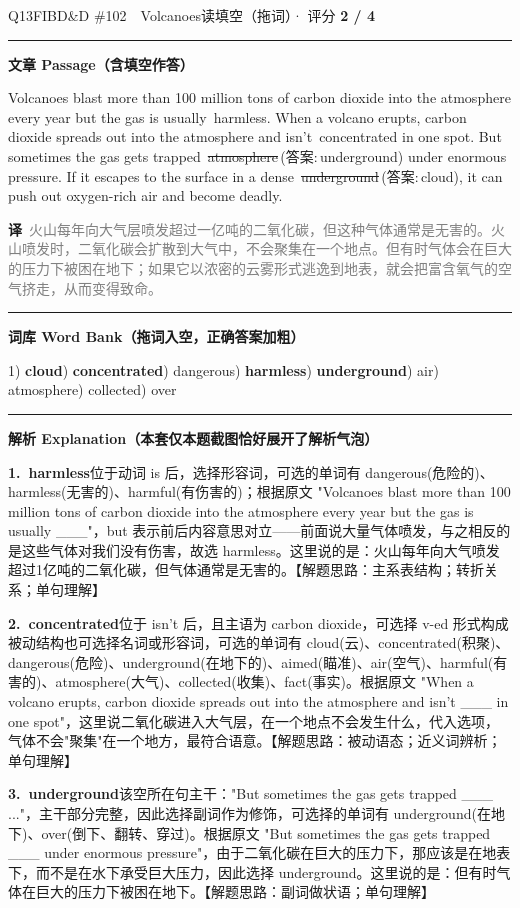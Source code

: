 \documentclass[11pt]{article}
\newcommand{\ptesub}[1]{%
  \par\needspace{2\baselineskip}\smallskip
  {\color{cAccent}\rule[-0.2ex]{3pt}{1.05em}}\hspace{6pt}%
  {\bfseries\color{cHead}#1}\par\nopagebreak\smallskip}
\newcommand{\zh}[1]{{\footnotesize\textcolor{cNote}{\textbf{译}}\ \textcolor{gray}{#1}}}
\newcommand{\rok}[1]{{\color{cFix}\ding{51}\,#1}}                 %
\newcommand{\rno}[2]{{\color{cWrong}\ding{55}\,\sout{#1}}\,{\footnotesize\color{cFix}(答案:\,#2)}}  %
\begin{document}
\begin{qblock}{Q13\quad FIBD\&D \#102\ \ Volcanoes}{读填空（拖词）· 评分 \textcolor{cAccent}{\bfseries 2 / 4}}
\ptesub{文章 Passage（含填空作答）}
\begin{promptbox}
Volcanoes blast more than 100 million tons of carbon dioxide into the atmosphere every year but the gas is usually \rok{harmless}. When a volcano erupts, carbon dioxide spreads out into the atmosphere and isn't \rok{concentrated} in one spot. But sometimes the gas gets trapped \rno{atmosphere}{underground} under enormous pressure. If it escapes to the surface in a dense \rno{underground}{cloud}, it can push out oxygen-rich air and become deadly.
\end{promptbox}
\zh{火山每年向大气层喷发超过一亿吨的二氧化碳，但这种气体通常是无害的。火山喷发时，二氧化碳会扩散到大气中，不会聚集在一个地点。但有时气体会在巨大的压力下被困在地下；如果它以浓密的云雾形式逃逸到地表，就会把富含氧气的空气挤走，从而变得致命。}
\ptesub{词库 Word Bank（拖词入空，正确答案加粗）}
{\small 1) \textbf{cloud}) \textbf{concentrated}) dangerous) \textbf{harmless}) \textbf{underground}) air) atmosphere) collected) over}
\ptesub{解析 Explanation（本套仅本题截图恰好展开了解析气泡）}
\begin{notebox}\footnotesize
\textbf{1.\ harmless}\quad 位于动词 is 后，选择形容词，可选的单词有 dangerous(危险的)、harmless(无害的)、harmful(有伤害的)；根据原文 "Volcanoes blast more than 100 million tons of carbon dioxide into the atmosphere every year but the gas is usually \_\_\_"，but 表示前后内容意思对立——前面说大量气体喷发，与之相反的是这些气体对我们没有伤害，故选 harmless。这里说的是：火山每年向大气喷发超过1亿吨的二氧化碳，但气体通常是无害的。【解题思路：主系表结构；转折关系；单句理解】\par\smallskip
\textbf{2.\ concentrated}\quad 位于 isn't 后，且主语为 carbon dioxide，可选择 v-ed 形式构成被动结构也可选择名词或形容词，可选的单词有 cloud(云)、concentrated(积聚)、dangerous(危险)、underground(在地下的)、aimed(瞄准)、air(空气)、harmful(有害的)、atmosphere(大气)、collected(收集)、fact(事实)。根据原文 "When a volcano erupts, carbon dioxide spreads out into the atmosphere and isn't \_\_\_ in one spot"，这里说二氧化碳进入大气层，在一个地点不会发生什么，代入选项，气体不会"聚集"在一个地方，最符合语意。【解题思路：被动语态；近义词辨析；单句理解】\par\smallskip
\textbf{3.\ underground}\quad 该空所在句主干："But sometimes the gas gets trapped \_\_\_ ..."，主干部分完整，因此选择副词作为修饰，可选择的单词有 underground(在地下)、over(倒下、翻转、穿过)。根据原文 "But sometimes the gas gets trapped \_\_\_ under enormous pressure"，由于二氧化碳在巨大的压力下，那应该是在地表下，而不是在水下承受巨大压力，因此选择 underground。这里说的是：但有时气体在巨大的压力下被困在地下。【解题思路：副词做状语；单句理解】\par\smallskip

\end{notebox}
\end{qblock}
\end{document}

